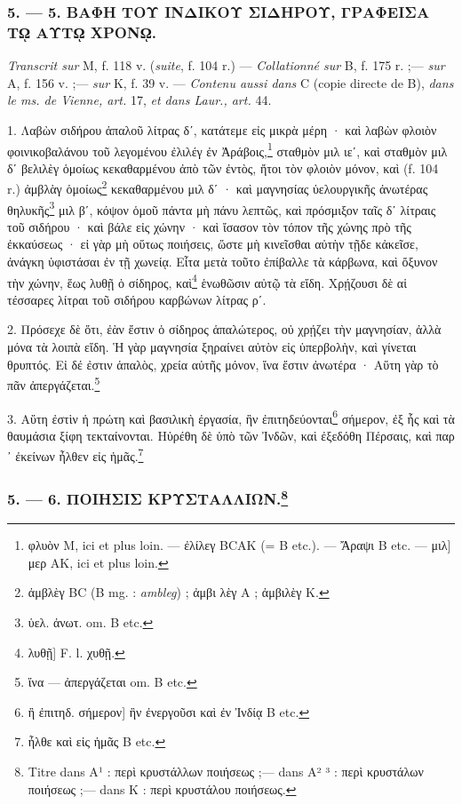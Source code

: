 \documentclass[a4paper, 11pt, oneside, polutonikogreek, french]{article}
\begin{document}
\bigskip
\centerline{\EightStarTaper}
\centerline{\EightStarTaper\EightStarTaper}
\bigskip

\subsubsection{5. --- 5. ΒΑΦΗ ΤΟΥ ΙΝΔΙΚΟΥ ΣΙΔΗΡΟΥ, ΓΡΑΦΕΙΣΑ Τῼ ΑΥΤῼ ΧΡΟΝῼ.}

\emph{Transcrit sur} M, f. 118 v. (\emph{suite}, f. 104 r.) --- \emph{Collationné sur} B, f. 175 r. ;--- \emph{sur} A, f. 156 v. ;--- \emph{sur} K, f. 39 v. --- \emph{Contenu aussi dans} C (copie directe de B), \emph{dans le ms. de Vienne, art.} 17, \emph{et dans Laur., art.} 44.

1. Λαβὼν σιδήρου ἁπαλοῦ λίτρας δʹ, κατάτεμε εἰς μικρὰ μέρη · καὶ λαβὼν φλοιὸν φοινικοβαλάνου τοῦ λεγομένου ἐλιλέγ ἐν Ἀράβοις,\footnote{φλυὸν M, ici et plus loin. --- ἐλίλεγ BCAK (= B etc.). --- Ἄραψι B etc. --- μιλ] μερ AK, ici et plus loin.} σταθμὸν μιλ ιεʹ, καὶ σταθμὸν μιλ δʹ βελιλὲγ ὁμοίως κεκαθαρμένου ἀπὸ τῶν ἐντὸς, ἤτοι τὸν φλοιὸν μόνον, καὶ (f. 104 r.) ἀμβλὰγ ὁμοίως\footnote{ἀμβλὲγ BC (B mg. : \emph{ambleg}) ; ἀμβι λὲγ A ; ἀμβιλὲγ K.} κεκαθαρμένου μιλ δʹ · καὶ μαγνησίας ὑελουργικῆς ἀνωτέρας θηλυκῆς\footnote{ὑελ. ἀνωτ. om. B etc.} μιλ βʹ, κόψον ὁμοῦ πάντα μὴ πάνυ λεπτῶς, καὶ πρόσμιξον ταῖς δʹ λίτραις τοῦ σιδήρου · καὶ βάλε εἰς χώνην · καὶ ἴσασον τὸν τόπον τῆς χώνης πρὸ τῆς ἐκκαύσεως · εἰ γὰρ μὴ οὕτως ποιήσεις, ὥστε μὴ κινεῖσθαι αὐτὴν τῇδε κἀκεῖσε, ἀνάγκη ὑφιστάσαι ἐν τῇ χωνείᾳ. Εἶτα μετὰ τοῦτο ἐπίβαλλε τὰ κάρβωνα, καὶ ὄξυνον τὴν χώνην, ἕως λυθῇ ὁ σίδηρος, καὶ\footnote{λυθῇ] F. l. χυθῇ.} ἑνωθῶσιν αὐτῷ τὰ εἴδη. Χρῄζουσι δὲ αἱ τέσσαρες λίτραι τοῦ σιδήρου καρβώνων λίτρας ρʹ.

2. Πρόσεχε δὲ ὅτι, ἐὰν ἔστιν ὁ σίδηρος ἁπαλώτερος, οὐ χρῄζει τὴν μαγνησίαν, ἀλλὰ μόνα τὰ λοιπὰ εἴδη. Ἡ γὰρ μαγνησία ξηραίνει αὐτὸν εἰς ὑπερβολὴν, καὶ γίνεται θρυπτός. Εἰ δέ ἐστιν ἁπαλὸς, χρεία αὐτῆς μόνον, ἵνα ἔστιν ἀνωτέρα · Αὕτη γὰρ τὸ πᾶν ἀπεργάζεται.\footnote{ἵνα --- ἀπεργάζεται om. B etc.}

3. Αὕτη ἐστὶν ἡ πρώτη καὶ βασιλικὴ ἐργασία, ἣν ἐπιτηδεύονται\footnote{ἣ ἐπιτηδ. σήμερον] ἣν ἐνεργοῦσι καὶ ἐν Ἰνδίᾳ B etc.} σήμερον, ἐξ ἧς καὶ τὰ θαυμάσια ξίφη τεκταίνονται. Ηὑρέθη δὲ ὑπὸ τῶν Ἰνδῶν, καὶ ἐξεδόθη Πέρσαις, καὶ παρ ᾽ ἐκείνων ἦλθεν εἰς ἡμᾶς.\footnote{ἦλθε καὶ εἰς ἡμᾶς B etc.}

\bigskip
\centerline{\EightStarTaper}
\centerline{\EightStarTaper\EightStarTaper}
\bigskip

\subsubsection[5. --- 6. ΠΟΙΗΣΙΣ ΚΡΥΣΤΑΛΛΙΩΝ.]{5. --- 6. ΠΟΙΗΣΙΣ ΚΡΥΣΤΑΛΛΙΩΝ.\footnote{Titre dans A¹ : περὶ κρυστάλλων ποιήσεως ;--- dans A² ³ : περὶ κρυστάλων ποιήσεως ;--- dans K : περὶ κρυστάλου ποιήσεως.}}
\end{document}
